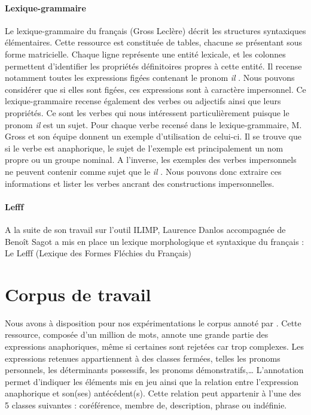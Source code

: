 \documentclass[a4paper,12pt]{article}
\begin{document}
\paragraph{Lexique-grammaire}
Le lexique-grammaire du français (Gross Leclère) décrit les structures syntaxiques élémentaires. Cette ressource est constituée de tables, chacune se présentant sous forme matricielle. Chaque ligne représente une entité lexicale, et les colonnes permettent d'identifier les propriétés définitoires propres à cette entité. Il recense notamment toutes les expressions figées contenant le pronom \og \textit{il} \fg{}. Nous pouvons considérer que si elles sont figées, ces expressions sont à caractère impersonnel. Ce lexique-grammaire recense également des verbes ou adjectifs ainsi que leurs propriétés. Ce sont les verbes qui nous intéressent particulièrement puisque le pronom \og \textit{il} \fg{} est un sujet. Pour chaque verbe recensé dans le lexique-grammaire, M. Gross et son équipe donnent un exemple d'utilisation de celui-ci. Il se trouve que si le verbe est anaphorique, le sujet de l'exemple est principalement un nom propre ou un groupe nominal. A l'inverse, les exemples des verbes impersonnels ne peuvent contenir comme sujet que le \og \textit{il} \fg{}. Nous pouvons donc extraire ces informations et lister les verbes ancrant des constructions impersonnelles.

\paragraph{Lefff}
A la suite de son travail sur l'outil ILIMP, Laurence Danlos accompagnée de Benoît Sagot a mis en place un lexique morphologique et syntaxique du français : Le Lefff (Lexique des Formes Fléchies du Français)

\section{Corpus de travail}
\label{corpus}

Nous avons à disposition pour nos expérimentations le corpus annoté par \citet{tutin-hal-00373327}.
Cette ressource, composée d'un million de mots, annote une grande partie des expressions anaphoriques, même si certaines sont rejetées car trop complexes. Les expressions retenues appartiennent à des classes fermées, telles les pronoms personnels, les déterminants possessifs, les pronoms démonstratifs,\ldots
L'annotation permet d'indiquer les éléments mis en jeu ainsi que la relation entre l'expression anaphorique et son(ses) antécédent(s). Cette relation peut appartenir à l'une des 5 classes suivantes : coréférence, membre de, description, phrase ou indéfinie.
\end{document}
